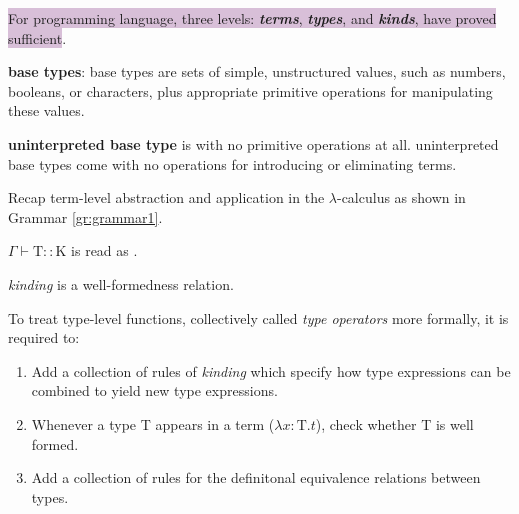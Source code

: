 \colorbox{thistle}{For programming language, three levels: \textit{\textbf{terms}}, \textit{\textbf{types}}, and \textit{\textbf{kinds}}, have proved sufficient}.

\textbf{base types}: base types are sets of simple, unstructured values, such as numbers, booleans, or characters, plus appropriate primitive operations for manipulating these values.

\textbf{uninterpreted base type} is with no primitive operations at all. uninterpreted base types come with no operations for introducing or eliminating terms.

Recap term-level abstraction and application in the $\lambda$-calculus as shown in Grammar \ref{gr:grammar1}.

$\Gamma \vdash \text{T}::\text{K}$ is read as .



\textit{kinding} is a well-formedness relation.

\begin{question}{To treat type-level functions, collectively called \textit{type operators} more formally, it is required to:}
\begin{enumerate}
    \setlength\itemsep{-.3em}
    \item Add a collection of rules of \textit{kinding} which specify how type expressions can be combined to yield new type expressions.
    \item Whenever a type T appears in a term ($\lambda x:\text{T}.t$), check whether T is well formed.
    \item Add a collection of rules for the definitonal equivalence relations between types.
\end{enumerate}
\end{question}

\begin{grammar}
\end{grammar}